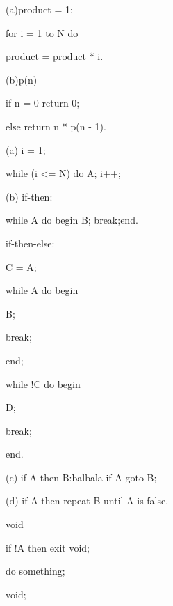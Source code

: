 \documentclass[a4paper, justified]{tufte-handout}
\begin{document}
\begin{problem}[DH 2.7: Factorial]
\end{problem}

\begin{solution}

  (a)product = 1;

  for i = 1 to N do

  product = product * i.

  (b)p(n)

  if n = 0 return 0;

  else return n * p(n - 1).
\end{solution}

\begin{problem}[DH 2.5: Simulation]
\end{problem}

\begin{solution}

  (a) i = 1;

  while (i <= N) do {A; i++;}

  (b) if-then:

  while A do begin B; break;end.

  if-then-else:

  C = A;

  while A do begin

  B;

  break;

  end;

  while !C do begin

  D;

  break;

  end.

  (c) if A then B:balbala if A goto B;

  (d) if A then repeat B until A is false.
\end{solution}

\begin{problem}[DH 2.8: Simulation]
\end{problem}

\begin{solution}
  void

  if !A then exit void;

  do something;

  void;
\end{solution}

\beginoptional
\end{document}
